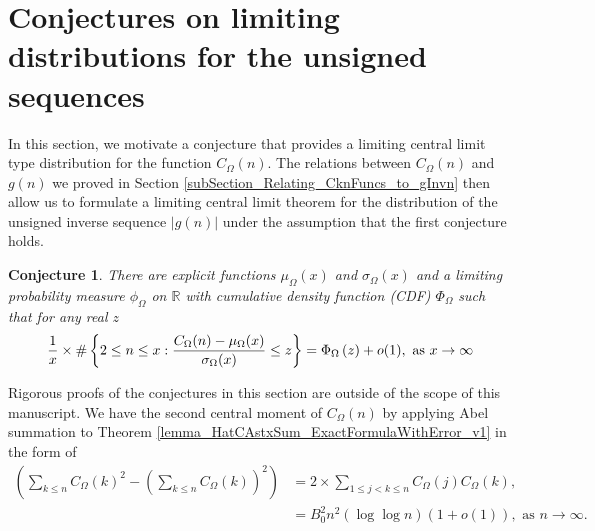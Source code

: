 \documentclass[11pt,reqno,a4letter]{article}
\newcommand{\hlocalref}[1]{\hyperref[#1]{\ref{#1}}}
\numberwithin{equation}{section}
\numberwithin{figure}{section}
\numberwithin{table}{section}
\theoremstyle{plain}
\newtheorem{conjecture}[theorem]{Conjecture}
\numberwithin{theorem}{section}
\theoremstyle{definition}
\begin{document}
\section{Conjectures on limiting distributions for the unsigned sequences} 
\label{subSection_ErdosKacTheorem_Analogs} 

In this section, we motivate a conjecture that provides a limiting 
central limit type distribution for the function $C_{\Omega}(n)$. 
The relations between $C_{\Omega}(n)$ and $g(n)$ we proved in 
Section \hlocalref{subSection_Relating_CknFuncs_to_gInvn} then 
allow us to formulate a limiting central limit theorem for the distribution 
of the unsigned inverse sequence $|g(n)|$ under the assumption that 
the first conjecture holds. 

\begin{conjecture}
\label{conj_DetFormOfEKTypeThmForCOmegan_v1} 
There are explicit functions $\mu_{\Omega}(x)$ and $\sigma_{\Omega}(x)$ and a 
limiting probability measure $\phi_{\Omega}$ 
on $\mathbb{R}$ with cumulative density function (CDF) 
$\Phi_{\Omega}$ such that for any real $z$ 
\begin{equation} 
\notag
\frac{1}{x} \times \#\left\{2 \leq n \leq x: 
     \frac{C_{\Omega}(n) - \mu_{\Omega}(x)}{\sigma_{\Omega}(x)} \leq z\right\} = 
     \Phi_{\Omega}\left(z\right) + o(1), 
     \mathrm{\ as\ } x \rightarrow \infty
\end{equation}
\end{conjecture} 

Rigorous proofs of the conjectures in this section are outside of the scope of this manuscript. 
We have the second central moment of $C_{\Omega}(n)$ 
by applying Abel summation to 
Theorem \hlocalref{lemma_HatCAstxSum_ExactFormulaWithError_v1} in the form of 
\begin{align*}
\left(\sum_{k \leq n} C_{\Omega}(k)^2 - 
     \left(\sum_{k \leq n} C_{\Omega}(k)\right)^2\right) & = 
     2 \times \sum_{1 \leq j < k \leq n} C_{\Omega}(j) C_{\Omega}(k), \\ 
     & = 
     B_0^2 n^2 (\log\log n) (1 + o(1)), \text{ as } n \rightarrow \infty. 
\end{align*}
\end{document}
